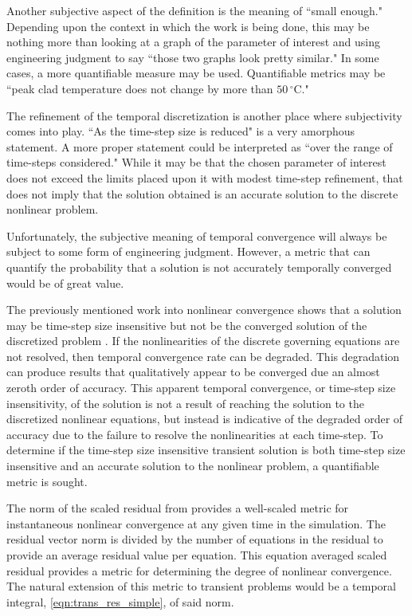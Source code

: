 Another subjective aspect of the definition is the meaning of ``small enough."
Depending upon the context in which the work is being done, this may be nothing more than looking at a graph of the parameter of interest and using engineering judgment to say ``those two graphs look pretty similar."
In some cases, a more quantifiable measure may be used.
Quantifiable metrics may be  ``peak clad temperature does not change by more than $50\,^{\circ}\mathrm{C}$."

The refinement of the temporal discretization is another place where subjectivity comes into play.
``As the time-step size is reduced" is a very amorphous statement.
A more proper statement could be interpreted as ``over the range of time-steps considered."
While it may be that the chosen parameter of interest does not exceed the limits placed upon it with modest time-step refinement, that does not imply that the solution obtained is an accurate solution to the discrete nonlinear problem.

Unfortunately, the subjective meaning of temporal convergence will always be subject to some form of engineering judgment. However, a metric that can quantify the probability that a solution is not accurately temporally converged would be of great value.

The previously mentioned work into nonlinear convergence shows that a solution may be time-step size insensitive but not be the converged solution of the discretized problem \cite{Knoll2001}.
If the nonlinearities of the discrete governing equations are not resolved, then temporal convergence rate can be degraded.
This degradation can produce results that qualitatively appear to be converged due an almost zeroth order of accuracy.
This apparent temporal convergence, or time-step size insensitivity, of the solution is not a result of reaching the solution to the discretized nonlinear equations, but instead is indicative of the degraded order of accuracy due to the failure to resolve the nonlinearities at each time-step.
To determine if the time-step size insensitive transient solution is both time-step size insensitive and an accurate solution to the nonlinear problem, a quantifiable metric is sought.

The norm of the scaled residual from  provides a well-scaled metric for instantaneous nonlinear convergence at any given time in the simulation.
The residual vector norm is divided by the number of equations in the residual to provide an average residual value per equation.
This equation averaged scaled residual provides a metric for determining the degree of nonlinear convergence.
The natural extension of this metric to transient problems would be a temporal integral, \eqref{eqn:trans_res_simple}, of said norm.

